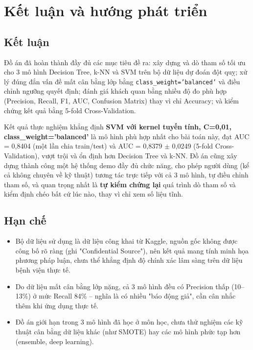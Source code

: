 \documentclass[12pt,a4paper]{report}
\begin{document}
\chapter{Kết luận và hướng phát triển}

\section{Kết luận}

Đồ án đã hoàn thành đầy đủ các mục tiêu đề ra: xây dựng và dò tham số tối ưu cho 3 mô hình Decision Tree, k-NN và SVM trên bộ dữ liệu dự đoán đột quỵ; xử lý đúng đắn vấn đề mất cân bằng lớp bằng \texttt{class\_weight='balanced'} và điều chỉnh ngưỡng quyết định; đánh giá khách quan bằng nhiều độ đo phù hợp (Precision, Recall, F1, AUC, Confusion Matrix) thay vì chỉ Accuracy; và kiểm chứng kết quả bằng 5-fold Cross-Validation.

Kết quả thực nghiệm khẳng định \textbf{SVM với kernel tuyến tính, C=0,01, class\_weight='balanced'} là mô hình phù hợp nhất cho bài toán này, đạt AUC = 0,8404 (một lần chia train/test) và AUC = 0,8379 $\pm$ 0,0249 (5-fold Cross-Validation), vượt trội và ổn định hơn Decision Tree và k-NN. Đồ án cũng xây dựng thành công một hệ thống demo đầy đủ chức năng, cho phép người dùng (kể cả không chuyên về kỹ thuật) tương tác trực tiếp với cả 3 mô hình, tự điều chỉnh tham số, và quan trọng nhất là \textbf{tự kiểm chứng lại} quá trình dò tham số và kiểm định chéo bất cứ lúc nào, thay vì chỉ xem số liệu tĩnh.

\section{Hạn chế}

\begin{itemize}
    \item Bộ dữ liệu sử dụng là dữ liệu công khai từ Kaggle, nguồn gốc không được công bố rõ ràng (ghi "Confidential Source"), nên kết quả mang tính minh họa phương pháp luận, chưa thể khẳng định độ chính xác lâm sàng trên dữ liệu bệnh viện thực tế.
    \item Do dữ liệu mất cân bằng lớp nặng, cả 3 mô hình đều có Precision thấp (10--13\%) ở mức Recall 84\% -- nghĩa là có nhiều "báo động giả", cần cân nhắc thêm khi ứng dụng thực tế.
    \item Đồ án giới hạn trong 3 mô hình đã học ở môn học, chưa thử nghiệm các kỹ thuật cân bằng dữ liệu khác (như SMOTE) hay các mô hình phức tạp hơn (ensemble, deep learning).
\end{itemize}
\end{document}
